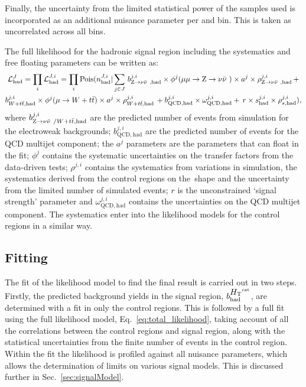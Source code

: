 Finally, the uncertainty from the limited statistical power of the \MC
samples used is incorporated as an additional nuisance parameter per
\htcat and \MHT bin. This is taken as uncorrelated across all bins.

The full likelihood for the hadronic signal region including the
systematics and free floating parameters can be written as:
\small
\begin{multline}
\label{eq:hadronicLikelihood}
\mathcal{L}^{J}_{\mathrm{had}} = \prod_i \mathcal{L}^{J,i}_{\mathrm{had}} = \prod_i \mathrm{Pois}(n^{J,i}_{\mathrm{had}} |\sum_{j \in J}\, b^{j,i}_{{\text Z} \rightarrow \nu\bar{\nu}~,\mathrm{had}}\times\phi^{j}(\mu\mu\rightarrow{\text Z} \rightarrow \nu\bar{\nu}~)\times a^{j}\times\rho^{j,i}_{{\text Z} \rightarrow \nu\bar{\nu}~,\mathrm{had}}\, + \\ 
b^{j,i}_{W+t\bar{t},\mathrm{had}}\times\phi^{j}(\mu\rightarrow W+t\bar{t})\times a^{j}\times\rho^{j,i}_{W+t\bar{t},\mathrm{had}}\, + b^{j,i}_{\text{QCD},\mathrm{had}}\times\omega^{j,i}_{\text{QCD},\mathrm{had}} + \,r\times s^{j,i}_{\mathrm{had}}\times\rho^{j,i}_{s,\mathrm{had}}),
\end{multline}
\normalsize
where $b^{j,i}_{{\text Z} \rightarrow \nu\bar{\nu}~/W+t\bar{t},\mathrm{had}}$ are the predicted number of events
from simulation for the electroweak backgrounds;
$b^{j,i}_{\text{QCD},\mathrm{had}}$ are the predicted number of events for the
QCD multijet component; the $a^{j}$ parameters are the parameters
that can float in the fit; $\phi^{j}$ contains the systematic uncertainties on
the transfer factors from the data-driven tests; $\rho^{j,i}$ contains the
systematics from variations in simulation, the systematics derived from the
control regions on the~\mht shape and the uncertainty from the limited number
of simulated events; $r$ is the unconstrained `signal strength' parameter and
$\omega_{\text{QCD},\mathrm{had}}^{j,i}$ contains the uncertainties on
the QCD multijet component. The systematics enter into the
likelihood models for the control regions in a similar way.

\subsection{Fitting}

The fit of the likelihood model to find the final result is carried
out in two steps. Firstly, the predicted background yields in the
signal region, $b^{\mbox{$H_\text{T}$}^{\text{cat}}}_{\mathrm{had}}$, are determined with a fit
in only the control regions. This is
followed by a full fit using the full likelihood model,
Eq.~\ref{eq:total_likelihood}, taking account of all the correlations
between the control regions and signal region, along with the
statistical uncertainties from the
finite number of events in the control region. Within the fit the
likelihood is profiled against all nuisance parameters, which allows
the determination of limits on various signal models. This is
discussed further in Sec.~\ref{sec:signalModel}.



